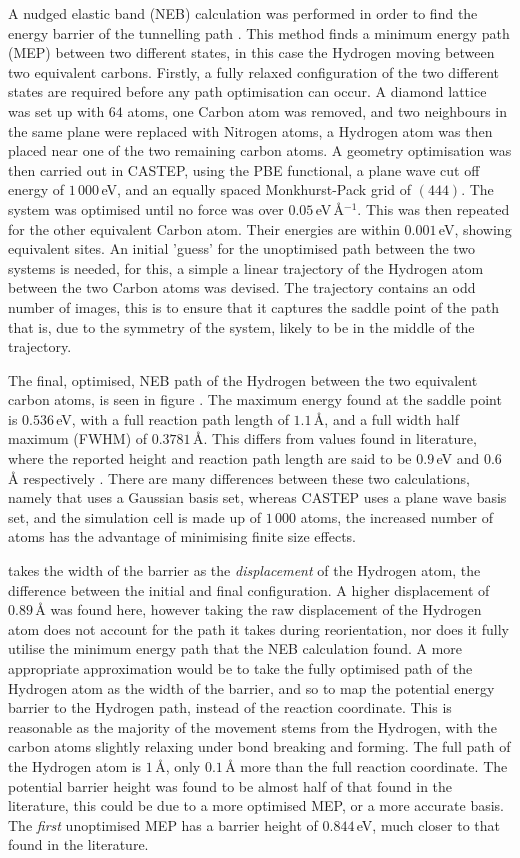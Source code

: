 \documentclass[10pt,a4paper,twocolumn,twoside]{extarticle}
\begin{document}
A nudged elastic band (NEB) calculation was performed in order to find the energy barrier of the tunnelling path \cite{NEB}.
This method finds a minimum energy path (MEP) between two different states, in this case the Hydrogen moving between two equivalent carbons.
Firstly, a fully relaxed configuration of the two different states are required before any path optimisation can occur.
A diamond lattice was set up with $64$ atoms, one Carbon atom was removed, and two neighbours in the same plane were replaced with Nitrogen atoms, a Hydrogen atom was then placed near one of the two remaining carbon atoms. A geometry optimisation was then carried out in CASTEP, using the PBE functional, a plane wave cut off energy of $1\,000$\,eV, and an equally spaced Monkhurst-Pack grid of $(4 4 4)$. The system was optimised until no force was over $0.05$\,eV\,\AA$^{-1}$. This was then repeated for the other equivalent Carbon atom. Their energies are within $0.001$\,eV, showing equivalent sites. 
An initial 'guess' for the unoptimised path between the two systems is needed, for this, a simple a linear trajectory of the Hydrogen atom between the two Carbon atoms was devised. The trajectory contains an odd number of images, this is to ensure that it captures the saddle point of the path that is, due to the symmetry of the system, likely to be in the middle of the trajectory. 

The final, optimised, NEB path of the Hydrogen between the two equivalent carbon atoms, is seen in figure . The maximum energy found at the saddle point is $0.536$\,eV, with a full reaction path length of $1.1$\,\AA, and a full width half maximum (FWHM) of $0.3781$\,\AA. This differs from values found in literature, where the reported height and reaction path length are said to be $0.9$\,eV and $0.6$\,{\AA} respectively \cite{Peaker}. There are many differences between these two calculations, namely that \textcite{Peaker} uses a Gaussian basis set, whereas CASTEP uses a plane wave basis set, and the simulation cell is made up of $1\,000$ atoms, the increased number of atoms has the advantage of minimising finite size effects. 

\textcite{Peaker} takes the width of the barrier as the \emph{displacement} of the Hydrogen atom, the difference between the initial and final configuration. A higher displacement of $0.89$\,{\AA} was found here, however taking the raw displacement of the Hydrogen atom does not account for the path it takes during reorientation, nor does it fully utilise the minimum energy path that the NEB calculation found. A more appropriate approximation would be to take the fully optimised path of the Hydrogen atom as the width of the barrier, and so to map the potential energy barrier to the Hydrogen path, instead of the reaction coordinate. This is reasonable as the majority of the movement stems from the Hydrogen, with the carbon atoms slightly relaxing under bond breaking and forming. The full path of the Hydrogen atom is $1$\,{\AA}, only $0.1$\,{\AA} more than the full reaction coordinate. The potential barrier height was found to be almost half of that found in the literature, this could be due to a more optimised MEP, or a more accurate basis. The \emph{first} unoptimised MEP has a barrier height of $0.844$\,eV, much closer to that found in the literature. 
\end{document}
